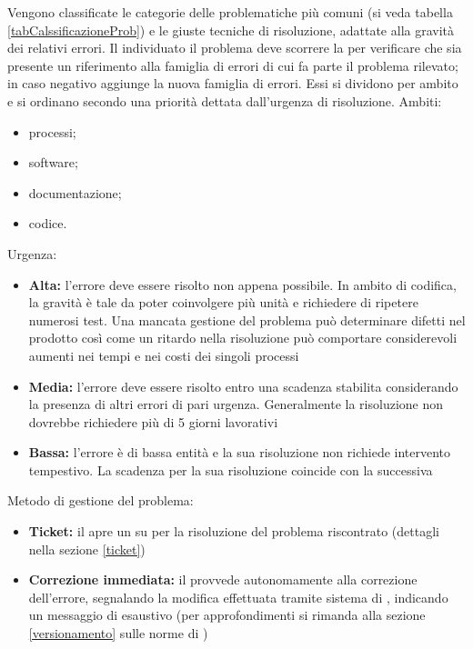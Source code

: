 \documentclass[12pt,a4paper]{article}
\begin{document}
Vengono classificate le categorie delle problematiche più comuni (si veda tabella \ref{tabCalssificazioneProb}) e le giuste tecniche di risoluzione, adattate alla gravità dei relativi errori. Il \VR{} individuato il problema deve scorrere la  per verificare che sia presente un riferimento alla famiglia di errori di cui fa parte il problema rilevato; in caso negativo aggiunge la nuova famiglia di errori.
Essi si dividono per ambito e si ordinano secondo una priorità dettata dall'urgenza di risoluzione.
Ambiti:
\begin{itemize}
	\item processi;
	\item software;
	\item documentazione;
	\item codice.
\end{itemize}
Urgenza:
\begin{itemize}
	\item \textbf{Alta:} l'errore deve essere risolto non appena possibile. In ambito di codifica, la gravità è tale da poter coinvolgere più unità e richiedere di ripetere numerosi test. Una mancata gestione del problema può determinare difetti nel prodotto così come un ritardo nella risoluzione può comportare considerevoli aumenti nei tempi e nei costi dei singoli processi
	\item \textbf{Media:} l'errore deve essere risolto entro una scadenza stabilita considerando la presenza di altri errori di pari urgenza. Generalmente la risoluzione non dovrebbe richiedere più di 5 giorni lavorativi
	\item \textbf{Bassa:} l'errore è di bassa entità e la sua risoluzione non richiede intervento tempestivo. La scadenza per la sua risoluzione coincide con la  successiva
\end{itemize}
Metodo di gestione del problema:
\begin{itemize}
	\item \textbf{Ticket:} il \VR{} apre un  su  per la risoluzione del problema riscontrato (dettagli nella sezione \ref{ticket})
	\item \textbf{Correzione immediata:} il \VR{} provvede autonomamente alla correzione dell'errore, segnalando la modifica effettuata tramite sistema di , indicando un messaggio di  esaustivo (per approfondimenti si rimanda alla sezione \ref{versionamento} sulle norme di )
\end{itemize}
\end{document}
